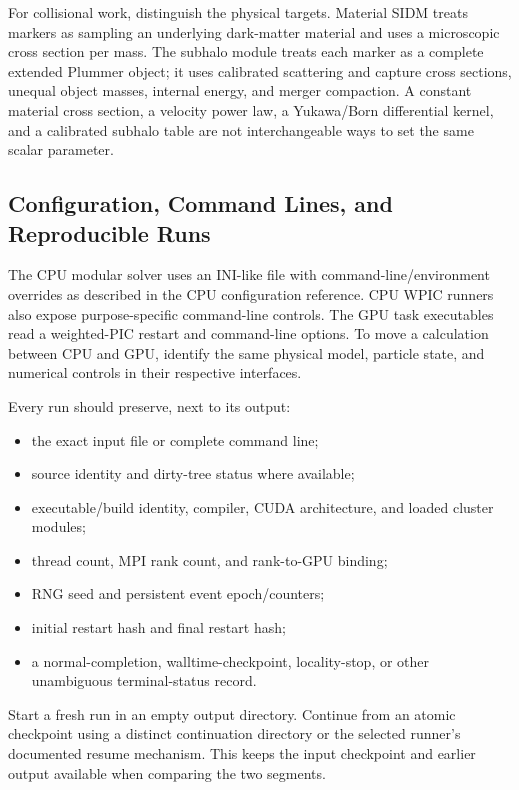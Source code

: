 For collisional work, distinguish the physical targets.  Material SIDM treats
markers as sampling an underlying dark-matter material and uses a microscopic
cross section per mass.  The subhalo module treats each marker as a
complete extended Plummer object; it uses calibrated scattering and capture
cross sections, unequal object masses, internal energy, and merger
compaction.  A constant material cross section, a velocity power law, a
Yukawa/Born differential kernel, and a calibrated subhalo table are not
interchangeable ways to set the same scalar parameter.

\subsection{Configuration, Command Lines, and Reproducible Runs}
\label{sec:configuration-shared}

The CPU modular solver uses an INI-like file with command-line/environment
overrides as described in the CPU configuration reference.  CPU WPIC runners
also expose purpose-specific command-line controls.  The GPU task executables read a weighted-PIC restart and command-line
options. To move a calculation between CPU and GPU, identify the same physical
model, particle state, and numerical controls in their respective interfaces.

Every run should preserve, next to its output:
\begin{itemize}
\item the exact input file or complete command line;
\item source identity and dirty-tree status where available;
\item executable/build identity, compiler, CUDA architecture, and loaded
cluster modules;
\item thread count, MPI rank count, and rank-to-GPU binding;
\item RNG seed and persistent event epoch/counters;
\item initial restart hash and final restart hash;
\item a normal-completion, walltime-checkpoint, locality-stop, or other
unambiguous terminal-status record.
\end{itemize}
Start a fresh run in an empty output directory. Continue from an atomic
checkpoint using a distinct continuation directory or the selected runner's
documented resume mechanism. This keeps the input checkpoint and earlier
output available when comparing the two segments.

